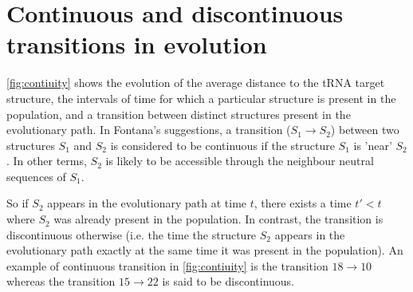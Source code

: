 \section{Continuous and discontinuous transitions in evolution}
\label{app:b8}
\autoref{fig:contiuity} shows the evolution of the average distance to the tRNA target structure, the intervals of time for which a particular structure is present in the population, and a transition between distinct structures present in the evolutionary path. In Fontana's suggestions, a transition ($S_1 \rightarrow S_2$) between two structures $S_1$ and $S_2$ is considered to be continuous if the structure $S_1$ is 'near' $S_2$. In other terms, $S_2$ is likely to be accessible through the neighbour neutral sequences of $S_1$. 

So if $S_2$ appears in the evolutionary path at time $t$, there exists a time $t'<t$ where $S_2$ was already present in the population. In contrast, the transition is discontinuous otherwise (i.e. the time the structure $S_2$ appears in the evolutionary path exactly at the same time it was present in the population). An example of continuous transition in \autoref{fig:contiuity} is the transition  $18 \rightarrow 10$ whereas the transition $15 \rightarrow 22$ is said to be discontinuous. 


